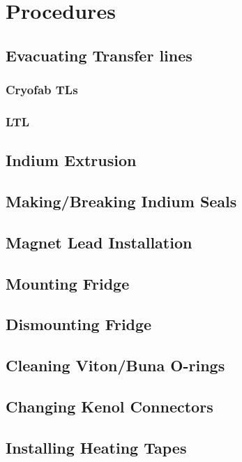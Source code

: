 \chapter{Procedures} 
\label{procedures}  
\section{Evacuating Transfer lines}

\subsection{Cryofab TLs}

\subsection{LTL}

\section{Indium Extrusion}

\section{Making/Breaking Indium Seals}

\section{Magnet Lead Installation}

\section{Mounting Fridge}

\section{Dismounting Fridge}

\section{Cleaning Viton/Buna O-rings}

\section{Changing Kenol Connectors}

\section{Installing Heating Tapes}

